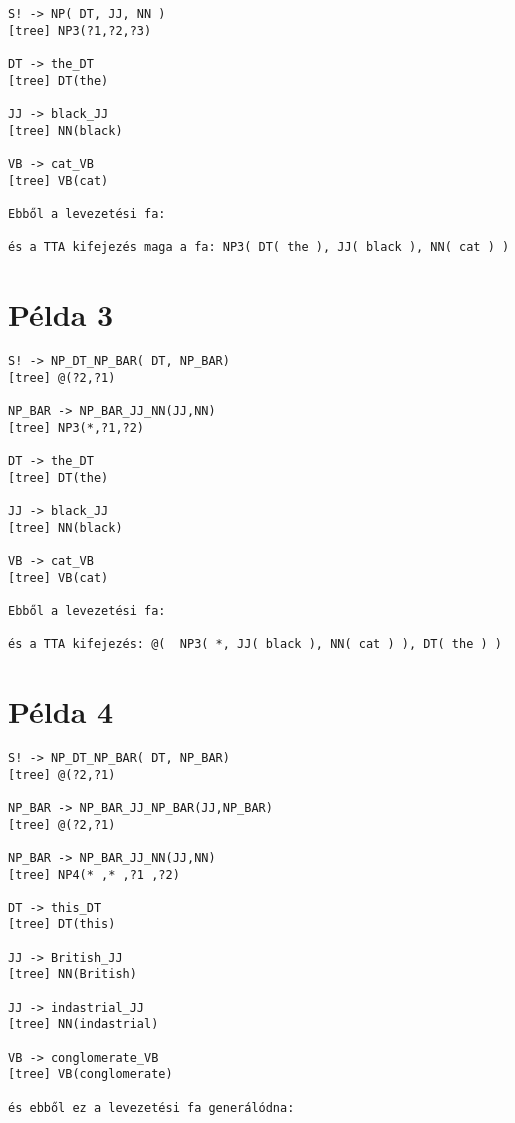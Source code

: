 \begin{verbatim}
S! -> NP( DT, JJ, NN )
[tree] NP3(?1,?2,?3)

DT -> the_DT
[tree] DT(the)

JJ -> black_JJ
[tree] NN(black)

VB -> cat_VB
[tree] VB(cat)

Ebből a levezetési fa:

és a TTA kifejezés maga a fa: NP3( DT( the ), JJ( black ), NN( cat ) )

\end{verbatim}



\section{Példa 3}
\label{sec:example3}

\begin{verbatim}
S! -> NP_DT_NP_BAR( DT, NP_BAR)
[tree] @(?2,?1)

NP_BAR -> NP_BAR_JJ_NN(JJ,NN)
[tree] NP3(*,?1,?2)

DT -> the_DT
[tree] DT(the)

JJ -> black_JJ
[tree] NN(black)

VB -> cat_VB
[tree] VB(cat)

Ebből a levezetési fa:

és a TTA kifejezés: @(  NP3( *, JJ( black ), NN( cat ) ), DT( the ) )

\end{verbatim}



\section{Példa 4}
\label{sec:example4}

\begin{verbatim}
S! -> NP_DT_NP_BAR( DT, NP_BAR)
[tree] @(?2,?1)

NP_BAR -> NP_BAR_JJ_NP_BAR(JJ,NP_BAR)
[tree] @(?2,?1)

NP_BAR -> NP_BAR_JJ_NN(JJ,NN)
[tree] NP4(* ,* ,?1 ,?2)

DT -> this_DT
[tree] DT(this)

JJ -> British_JJ
[tree] NN(British)

JJ -> indastrial_JJ
[tree] NN(indastrial)

VB -> conglomerate_VB
[tree] VB(conglomerate)

és ebből ez a levezetési fa generálódna:

\end{verbatim}



